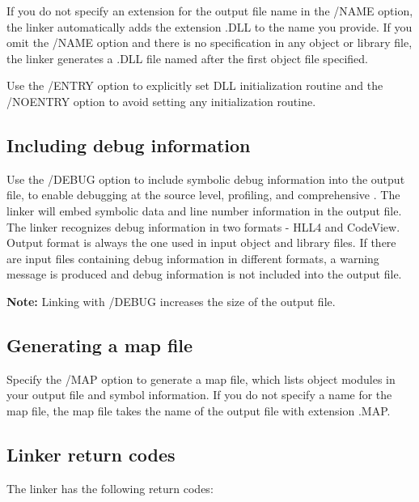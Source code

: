   If you do not specify an extension for the output file name in the /NAME
  option, the linker automatically adds the extension .DLL to the name you
  provide. If you omit the /NAME option and there is no
  specification in any object or library file, the linker generates a .DLL file
  named after the first object file specified.

  Use the /ENTRY option to explicitly set DLL initialization routine
  and the /NOENTRY option to avoid setting any initialization
  routine.

\subsection{Including debug information}
\label{link:inout:gendebug}

 Use the /DEBUG option to include symbolic debug information into the output file,
 to enable debugging at the source level, profiling, and      %
 comprehensive .
 The linker will embed symbolic data and line
 number information in the output file. The linker recognizes debug information
 in two formats - HLL4 and CodeView. Output format is always the one used in
 input object and library files. If there are input files containing
 debug information in different formats, a warning message is produced and debug
 information is not included into the output file.

 {\bf Note:} Linking with /DEBUG increases the size of the output file.

\subsection{Generating a map file}
\label{link:inout:genmap}

 Specify the /MAP option to generate a map file, which lists object modules in
 your output file and symbol information. If you do not specify a name for the
 map file, the map file takes the name of the output file with extension .MAP.

\subsection{Linker return codes}

 The linker has the following return codes:


